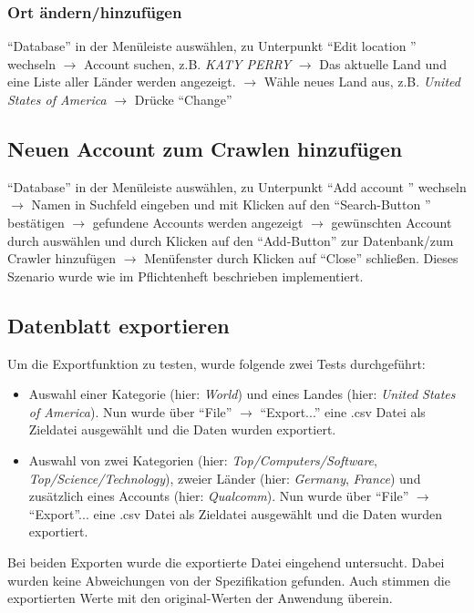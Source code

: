 \subsubsection{Ort ändern/hinzufügen}
"`Database"' in der Menüleiste auswählen, zu Unterpunkt "`Edit location "' wechseln $\to$ Account suchen, z.B. \textit{KATY PERRY} $\to$ Das aktuelle Land und eine Liste aller Länder werden angezeigt. $\to$ Wähle neues Land aus, z.B. \textit{United States of America} $\to$ Drücke "`Change"'
\subsection{Neuen Account zum Crawlen hinzufügen} \label{sec:AddNewAccount}
"`Database"' in der Menüleiste auswählen, zu Unterpunkt "`Add account "' wechseln $\to$ Namen in Suchfeld eingeben und mit Klicken auf den "`Search-Button "' bestätigen $\to $ gefundene Accounts werden angezeigt $\to$ gewünschten Account durch auswählen und durch Klicken auf den "`Add-Button"' zur Datenbank/zum Crawler hinzufügen $\to$ Menüfenster durch Klicken auf "`Close"' schließen.
Dieses Szenario wurde wie im Pflichtenheft beschrieben implementiert.

\subsection{Datenblatt exportieren}
Um die Exportfunktion zu testen, wurde folgende zwei Tests durchgeführt:
\begin{itemize}
	\item Auswahl einer Kategorie (hier: \textit{World}) und eines Landes (hier: \textit{United States of America}). Nun wurde über "`File"' $\to$ "`Export..."' eine .csv Datei als Zieldatei ausgewählt und die Daten wurden exportiert.
	\item Auswahl von zwei Kategorien (hier: \textit{Top/Computers/Software}, \textit{Top/Science/Technology}), zweier Länder (hier: \textit{Germany}, \textit{France}) und zusätzlich eines Accounts (hier: \textit{Qualcomm}). Nun wurde über "`File"' $\to$ "`Export"'... eine .csv Datei als Zieldatei ausgewählt und die Daten wurden exportiert.
\end{itemize}
Bei beiden Exporten wurde die exportierte Datei eingehend untersucht. Dabei wurden keine Abweichungen von der Spezifikation gefunden. Auch stimmen die exportierten Werte mit den original-Werten der Anwendung überein.
